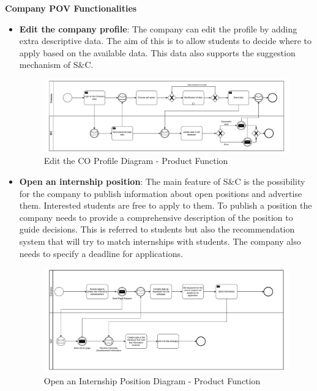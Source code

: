 \pagebreak

\par\textbf{Company POV Functionalities}

\begin{itemize}
      \item \textbf{Edit the company profile}: The company can edit the profile by adding extra descriptive data. The
            aim of this is to allow students to decide where to apply based on the available data. This data also
            supports the suggestion mechanism of S\&C.

            \begin{figure}[H]
                  \centering
                  \includegraphics[width=1.0\textwidth]{Images/BPMN_8.pdf}
                  \caption{Edit the CO Profile Diagram - Product Function}
                  \label{fig:edit_the_company_profile_diagram}
            \end{figure}

      \item \textbf{Open an internship position}: The main feature of S\&C is the possibility for the company to
            publish information about open positions and advertise them. Interested students are free to apply to them.
            To publish a position the company needs to provide a comprehensive description of the position to guide
            decisions. This is referred to students but also the recommendation system that will try to match
            internships with students. The company also needs to specify a deadline for applications.

            \begin{figure}[H]
                  \centering
                  \includegraphics[width=1.0\textwidth]{Images/BPMN_9.pdf}
                  \caption{Open an Internship Position Diagram - Product Function}
                  \label{fig:open_an_internship_position_diagram}
            \end{figure}


\end{itemize}
